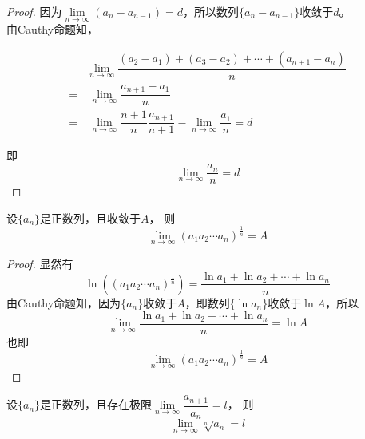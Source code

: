 \begin{proof}

    因为$\lim\limits_{n\to\infty}{(a_n - a_{n-1})} = d$，所以数列$\{a_n - a_{n - 1}\}$收敛于$d$。\\
    由\textup{Cauthy}命题知，
    
    \begin{align*}
        & \lim\limits_{n\to\infty}{\dfrac{(a_2 - a_1) + (a_3 - a_2) + \cdots + (a_{n + 1} - a_n)}{n}} \\
        = & \ \lim\limits_{n\to\infty}{\dfrac{a_{n + 1} - a_1}{n}} \\
        = & \ \lim\limits_{n\to\infty}{\dfrac{n + 1}{n} \dfrac{a_{n + 1}}{n + 1}} - \lim\limits_{n\to\infty}{\dfrac{a_1}{n}} = d
    \end{align*}

    即
    $$\lim\limits_{n\to\infty}{\dfrac{a_n}{n}} = d$$

\end{proof}

\begin{corollary}[Cauthy命题推论]

    设$\{a_n\}$是正数列，且收敛于$A$，
    则
    $$\lim\limits_{n\to\infty}{(a_1a_2\cdots a_n)^{\frac{1}{n}}} = A$$

\end{corollary}

\begin{proof}

    显然有
    $$\ln{\left((a_1a_2\cdots a_n)^{\frac{1}{n}}\right)} = \dfrac{\ln{a_1} + \ln{a_2} + \cdots + \ln{a_n}}{n}$$
    由\textup{Cauthy}命题知，因为$\{a_n\}$收敛于$A$，即数列$\{\ln{a_n}\}$收敛于$\ln{A}$，所以
    $$\lim\limits_{n\to\infty}{\dfrac{\ln{a_1} + \ln{a_2} + \cdots + \ln{a_n}}{n}} = \ln{A}$$
    也即
    $$\lim\limits_{n\to\infty}{(a_1a_2\cdots a_n)^{\frac{1}{n}}} = A$$

\end{proof}


\begin{corollary}[Cauthy命题推论]

    设$\{a_n\}$是正数列，且存在极限$\lim\limits_{n\to\infty}{\dfrac{a_{n+1}}{a_n}}=l$，
    则
    $$\lim\limits_{n\to\infty}{\sqrt[n]{a_n}} = l$$

\end{corollary}

